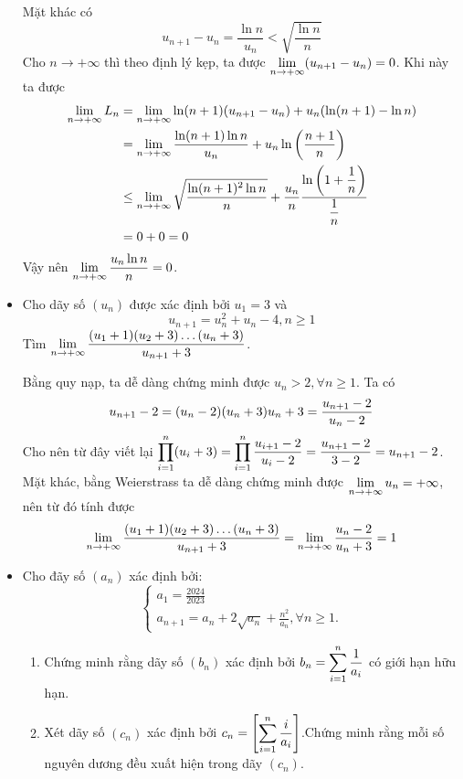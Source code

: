 \documentclass[11pt]{scrartcl}
\begin{document}
\begin{itemize}[label=, leftmargin=0em, itemsep=0.5em]
\begin{sol}
        Mặt khác có $$u_{n + 1} - u_n = \frac{\ln n}{u_n} < \sqrt{\frac{\ln n }{n}}$$ Cho $n \to +\infty$ thì theo định lý kẹp, ta được \(\displaystyle\lim_{n \to +\infty} (u_{n + 1} - u_n) = 0\). Khi này ta được 
        \[
        \begin{aligned}
            \dlim L_n &= \dlim\ln (n + 1)(u_{n + 1} - u_n) +u_n(\ln(n + 1) - \ln n)\\
            &= \dlim \frac{\ln(n + 1) \ln n}{u_n} + u_n \ln \left(\frac{n + 1}{n}\right)\\
            &\leq \dlim \sqrt{\frac{\ln(n + 1)^2\ln n}{n}} +\frac{u_n}{n}\frac{\ln\left(1 + \frac{1}{n}\right)}{\frac{1}{n}}\\
            &= 0 + 0 = 0
        \end{aligned}
        \]
        Vậy nên $\dlim \frac{u_n \ln n}{n} = 0$.
    \end{sol}
    \item \begin{bt}
        Cho dãy số $(u_n)$ được xác định bởi $u_1 = 3$ và $$u_{n + 1} = u_n^2 + u_n - 4, n \geq 1$$ Tìm $\dlim\frac{(u_1 + 1)(u_2 + 3)\dots(u_n + 3)}{u_{n + 1} +3}$.
    \end{bt}
    \begin{sol}
        Bằng quy nạp, ta dễ dàng chứng minh được $u_n > 2, \forall n \geq 1$. Ta có 
        \[
            u_{n + 1} - 2 = (u_n - 2)(u_n + 3) \lra u_n + 3 = \frac{u_{n + 1} - 2}{u_n - 2}
        \]
        Cho nên từ đây viết lại $\dprod_{i = 1}^n (u_i + 3) = \dprod_{i = 1}^n \frac{u_{i + 1} - 2}{u_i - 2} = \frac{u_{n + 1} - 2}{3- 2} = u_{n + 1} - 2$. Mặt khác, bằng Weierstrass ta dễ dàng chứng minh được $\displaystyle\lim_{n \to +\infty} u_n = +\infty$, nên từ đó tính được \[\dlim\frac{(u_1 + 1)(u_2 + 3)\dots(u_n + 3)}{u_{n + 1} +3} = \dlim \frac{u_n - 2}{u_n + 3} = 1\]
    \end{sol}
    \newpage
    
    \item \begin{bt}
        Cho đãy số $\left(a_n\right)$ xác định bởi: \[\left\{\begin{array}{l}a_1=\frac{2024}{2023} \\ a_{n+1}=a_n+2 \sqrt{a_n}+\frac{n^2}{a_n}, \forall n \geq 1 .\end{array}\right.\]
        \begin{enumerate}[label=(\alph*)]
            \item Chứng minh rằng dãy số $\left(b_n\right)$ xác định bởi $b_n=\dsum_{i=1}^n \frac{1}{a_i}$ có giới hạn hữu hạn.
            \item Xét dãy số $\left(c_n\right)$ xác định bởi $c_n=\left[\dsum_{i=1}^n \frac{i}{a_i}\right]$.Chứng minh rằng mỗi số nguyên dương đều xuất hiện trong dãy $\left(c_n\right)$.
        \end{enumerate}
        

\end{bt}
\end{itemize}
\end{document}
